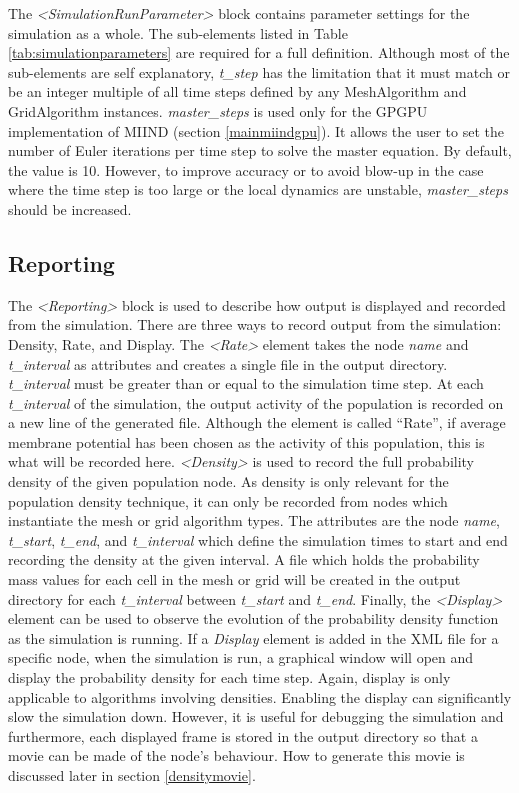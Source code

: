 \documentclass[utf8]{frontiersSCNS} %
\begin{document}
The \textit{\textless SimulationRunParameter\textgreater} block contains parameter settings for the simulation as a whole. The sub-elements listed in Table \ref{tab:simulationparameters} are required for a full definition. Although most of the sub-elements are self explanatory, \textit{t\_step} has the limitation that it must match or be an integer multiple of all time steps defined by any MeshAlgorithm and GridAlgorithm instances. \textit{master\_steps} is used only for the GPGPU implementation of MIIND (section \ref{mainmiindgpu}). It allows the user to set the number of Euler iterations per time step to solve the master equation. By default, the value is 10. However, to improve accuracy or to avoid blow-up in the case where the time step is too large or the local dynamics are unstable, \textit{master\_steps} should be increased. \\

\subsection{Reporting}

The \textit{\textless Reporting\textgreater} block is used to describe how output is displayed and recorded from the simulation. There are three ways to record output from the simulation: Density, Rate, and Display. The \textit{\textless Rate\textgreater} element takes the node \textit{name} and \textit{t\_interval} as attributes and creates a single file in the output directory. \textit{t\_interval} must be greater than or equal to the simulation time step. At each \textit{t\_interval} of the simulation, the output activity of the population is recorded on a new line of the generated file. Although the element is called ``Rate'', if average membrane potential has been chosen as the activity of this population, this is what will be recorded here. \textit{\textless Density\textgreater} is used to record the full probability density of the given population node. As density is only relevant for the population density technique, it can only be recorded from nodes which instantiate the mesh or grid algorithm types. The attributes are the node \textit{name}, \textit{t\_start}, \textit{t\_end}, and \textit{t\_interval} which define the simulation times to start and end recording the density at the given interval. A file which holds the probability mass values for each cell in the mesh or grid will be created in the output directory for each \textit{t\_interval} between \textit{t\_start} and \textit{t\_end}. Finally, the \textit{\textless Display\textgreater} element can be used to observe the evolution of the probability density function as the simulation is running. If a \textit{Display} element is added in the XML file for a specific node, when the simulation is run, a graphical window will open and display the probability density for each time step. Again, display is only applicable to algorithms involving densities. Enabling the display can significantly slow the simulation down. However, it is useful for debugging the simulation and furthermore, each displayed frame is stored in the output directory so that a movie can be made of the node’s behaviour. How to generate this movie is discussed later in section \ref{densitymovie}.
\end{document}
